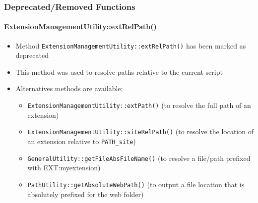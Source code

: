 \begin{frame}[fragile]
	\frametitle{Deprecated/Removed Functions}
	\framesubtitle{ExtensionManagementUtility::extRelPath()}

	\begin{itemize}

		\item Method \texttt{ExtensionManagementUtility::extRelPath()} has been marked as deprecated
		\item This method was used to resolve paths relative to the current script
		\item Alternatives methods are available:

			\begin{itemize}
				\item \texttt{ExtensionManagementUtility::extPath()}\newline
					(to resolve the full path of an extension)
				\item \texttt{ExtensionManagementUtility::siteRelPath()}\newline
					(to resolve the location of an extension relative to \texttt{PATH\_site})
				\item \texttt{GeneralUtility::getFileAbsFileName()}\newline
					(to resolve a file/path prefixed with EXT:myextension)
				\item \texttt{PathUtility::getAbsoluteWebPath()}\newline
					(to output a file location that is absolutely prefixed for the web folder)
			\end{itemize}

	\end{itemize}

\end{frame}


